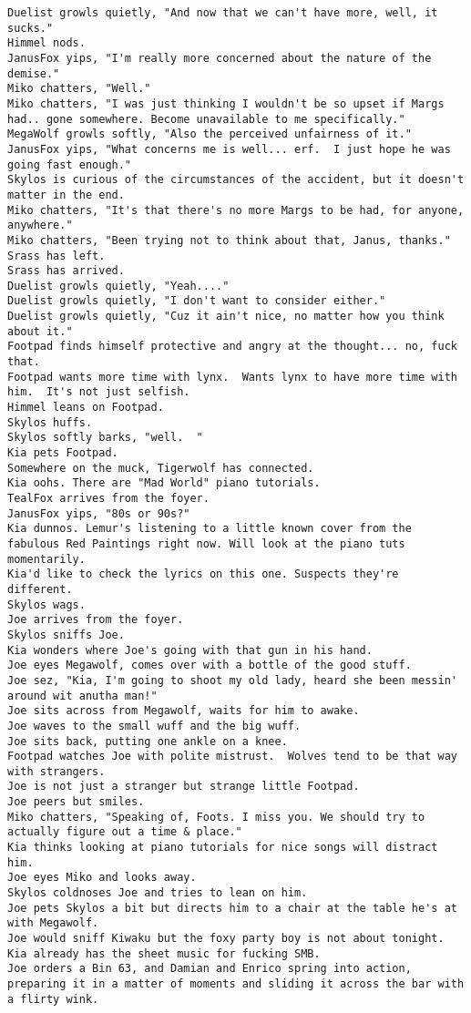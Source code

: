 \begin{verbatim}
Duelist growls quietly, "And now that we can't have more, well, it sucks."
Himmel nods.
JanusFox yips, "I'm really more concerned about the nature of the demise."
Miko chatters, "Well."
Miko chatters, "I was just thinking I wouldn't be so upset if Margs had.. gone somewhere. Become unavailable to me specifically."
MegaWolf growls softly, "Also the perceived unfairness of it."
JanusFox yips, "What concerns me is well... erf.  I just hope he was going fast enough."
Skylos is curious of the circumstances of the accident, but it doesn't matter in the end.
Miko chatters, "It's that there's no more Margs to be had, for anyone, anywhere."
Miko chatters, "Been trying not to think about that, Janus, thanks."
Srass has left.
Srass has arrived.
Duelist growls quietly, "Yeah...."
Duelist growls quietly, "I don't want to consider either."
Duelist growls quietly, "Cuz it ain't nice, no matter how you think about it."
Footpad finds himself protective and angry at the thought... no, fuck that.
Footpad wants more time with lynx.  Wants lynx to have more time with him.  It's not just selfish.
Himmel leans on Footpad.
Skylos huffs.
Skylos softly barks, "well.  "
Kia pets Footpad.
Somewhere on the muck, Tigerwolf has connected.
Kia oohs. There are "Mad World" piano tutorials.
TealFox arrives from the foyer.
JanusFox yips, "80s or 90s?"
Kia dunnos. Lemur's listening to a little known cover from the fabulous Red Paintings right now. Will look at the piano tuts momentarily.
Kia'd like to check the lyrics on this one. Suspects they're different.
Skylos wags.
Joe arrives from the foyer.
Skylos sniffs Joe.
Kia wonders where Joe's going with that gun in his hand.
Joe eyes Megawolf, comes over with a bottle of the good stuff.
Joe sez, "Kia, I'm going to shoot my old lady, heard she been messin' around wit anutha man!"
Joe sits across from Megawolf, waits for him to awake.
Joe waves to the small wuff and the big wuff.
Joe sits back, putting one ankle on a knee.
Footpad watches Joe with polite mistrust.  Wolves tend to be that way with strangers.
Joe is not just a stranger but strange little Footpad.
Joe peers but smiles.
Miko chatters, "Speaking of, Foots. I miss you. We should try to actually figure out a time & place."
Kia thinks looking at piano tutorials for nice songs will distract him.
Joe eyes Miko and looks away.
Skylos coldnoses Joe and tries to lean on him.
Joe pets Skylos a bit but directs him to a chair at the table he's at with Megawolf.
Joe would sniff Kiwaku but the foxy party boy is not about tonight.
Kia already has the sheet music for fucking SMB.
Joe orders a Bin 63, and Damian and Enrico spring into action, preparing it in a matter of moments and sliding it across the bar with a flirty wink.

\end{verbatim}
